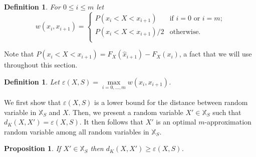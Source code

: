 \documentclass{article}
\newtheorem{definition}[thm]{Definition}
\newtheorem{proposition}[thm]{Proposition}
\begin{document}
	\begin{definition}\label{def:weight} For $0\leq i \leq m$ let
		\[
		w(x_i,x_{i+1})=
		\begin{cases}
		P(x_i < X < x_{i+1}) & \text{if $i=0$ or $i = m$;} \\
		P(x_i < X < x_{i+1})/2 & \text{otherwise.} \\	
		\end{cases}
		\]
	\end{definition}
	
	Note that $P(x_i < X < x_{i+1}) = F_X(\hat x_{i+1}) - F_X(x_i)$, a fact that we will use throughout this section.
	
	\begin{definition}\label{def:error}
		Let $\varepsilon(X,S) = \max\limits_{i=0,\dots,m} w(x_{i}, x_{i+1})$.
	\end{definition}
	
	
	
	We first show that $\varepsilon(X,S)$ is a lower bound for the distance between random variable in $\mathbb{X}_S$ and $X$. Then, we present a random variable $X'\in \mathbb{X}_S$ such that $d_K(X,X')=\varepsilon(X,S)$. It then follows that $X'$ is an optimal $m$-approximation random variable among all random variables in $\mathbb{X}_S$.
	
	
	
	\begin{proposition}\label{prop:minimal}
		If $X'\in\mathbb{X}_S$ then $d_K(X,X') \geq \varepsilon(X,S)$.
	\end{proposition}
	
\end{document}
